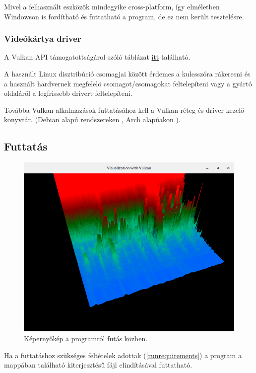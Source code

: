 Mivel a felhaszn\'alt eszk\"oz\"ok mindegyike cross-platform, \'igy elm\'eletben Windowson is ford\'ithat\'o \'es futtathat\'o a program, de ez nem ker\"ult tesztel\'esre.

\subsubsection{Vide\'ok\'artya driver}\label{gpudriver}
A Vulkan API t\'amogatotts\'ag\'arol sz\'ol\'o t\'abl\'azat \href{https://en.wikipedia.org/wiki/Vulkan_(API)\#Compatibility}{itt} tal\'alhat\'o.

A haszn\'alt Linux disztrib\'uci\'o csomagjai k\"oz\"ott \'erdemes a  kulcssz\'ora r\'akeresni \'es a haszn\'alt hardvernek megfelel\"o csomagot/csomagokat feltelep\'iteni vagy a gy\'art\'o oldal\'ar\H ol a legfrissebb drivert feltelep\'iteni.

Tov\'abba Vulkan alkalmaz\'asok futtat\'as\'ahoz kell a Vulkan r\'eteg-\'es driver kezel\H o konyvt\'ar. (Debian alap\'u rendszereken , Arch alap\'uakon ).

\subsection{Futtat\'as}
\begin{figure}[h]
	\includegraphics[width=\textwidth]{img/user/screenshot}
	\centering
	\caption{K\'eperny\H ok\'ep a programr\'ol fut\'as k\"ozben.}
\end{figure}

Ha a futtat\'ashoz sz\"uks\'eges felt\'etelek adottak (\ref{runrequirements}) a program a  mapp\'aban tal\'alhat\'o  kiterjeszt\'es\H u f\'ajl elind\'it\'as\'aval futtathat\'o. 

